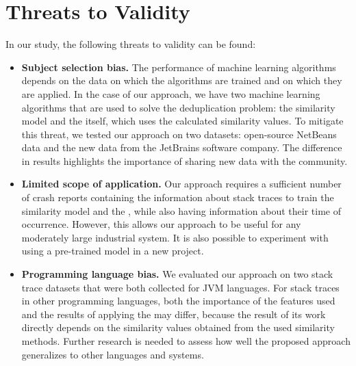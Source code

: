 \section{Threats to Validity}\label{sec:threats}
In our study, the following threats to validity can be found:
\begin{itemize}
    \item \textbf{Subject selection bias.}
    The performance of machine learning algorithms depends on the data on which the algorithms are trained and on which they are applied.
    In the case of our approach, we have two machine learning algorithms that are used to solve the deduplication problem: the similarity model and the \ag itself, which uses the calculated similarity values.
    To mitigate this threat, we tested our approach on two datasets: open-source NetBeans data and the new data from the JetBrains software company.
    The difference in results highlights the importance of sharing new data with the community.
    
    \item \textbf{Limited scope of application.}
    Our approach requires a sufficient number of crash reports containing the information about stack traces to train the similarity model and the \ag, while also having information about their time of occurrence.
    However, this allows our approach to be useful for any moderately large industrial system.
    It is also possible to experiment with using a pre-trained model in a new project.
    
    \item \textbf{Programming language bias.}
    We evaluated our approach on two stack trace datasets that were both collected for JVM languages.
    For stack traces in other programming languages, both the importance of the features used and the results of applying the \ag may differ, because the result of its work directly depends on the similarity values obtained from the used similarity methods.
    Further research is needed to assess how well the proposed approach generalizes to other languages and systems.
\end{itemize}